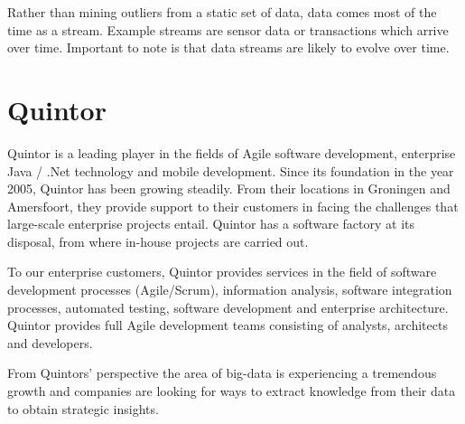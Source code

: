 Rather than mining outliers from a static set of data, data comes most of the time as a stream. Example streams are sensor data or transactions which arrive over time. Important to note is that data streams are likely to evolve over time.

\section{Quintor \label{sec1-Quintor}}
Quintor is a leading player in the fields of Agile software development, enterprise Java / .Net technology and mobile development. Since its foundation in the year 2005, Quintor has been growing steadily. From their locations in Groningen and Amersfoort, they provide support to their customers in facing the challenges that large-scale enterprise projects entail. Quintor has a software factory at its disposal, from where in-house projects are carried out. 

To our enterprise customers, Quintor provides services in the field of software development processes (Agile/Scrum), information analysis, software integration processes, automated testing, software development and enterprise architecture. Quintor provides full Agile development teams consisting of analysts, architects and developers.

From Quintors' perspective the area of big-data is experiencing a tremendous growth and companies are looking for ways to extract knowledge from their data to obtain strategic insights.